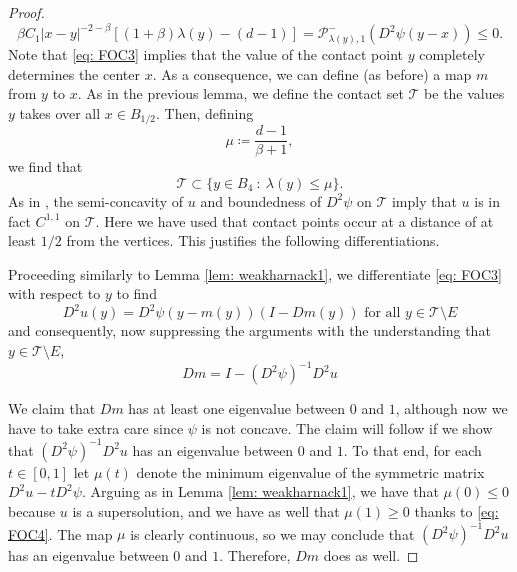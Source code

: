 \documentclass[reqno]{amsart}
\numberwithin{equation}{section}
\numberwithin{equation}{section}
\newcommand{\ds}{\displaystyle}
\begin{document}
\begin{proof}
\begin{equation}
\label{eq: doublingbetaeq} \beta C_1 |x-y|^{-2-\beta} [(1+\beta) \lambda(y) - (d-1)] =\mathcal{P}^-_{\lambda(y),1}(D^2\psi(y-x)) \le 0.
\end{equation}
Note that \eqref{eq: FOC3} implies that the value of the contact point $y$ completely determines the center $x$. As a consequence, we can define (as before) a map $m$ from $y$ to $x$. As in the previous lemma, we define the contact set $\mathcal{T}$ be the values $y$ takes over all $x \in B_{1/2}$. Then, defining 
$$\mu  \coloneqq \ds \frac{d-1}{\beta +1},$$
we find that 
\begin{equation}
\label{eq: contactsmallellipticity} \mathcal{T} \subset \{y \in B_4 \ : \ \lambda(y) \le \mu\}.
\end{equation}
As in \cite{ArmstrongSmart2014}, the semi-concavity of $u$ and boundedness of $D^2\psi$ on $\mathcal{T}$ imply that $u$ is in fact $C^{1,1}$ on $\mathcal{T}$. Here we have used that contact points occur at a distance of at least $1/2$ from the vertices. This justifies the following differentiations.

Proceeding similarly to Lemma \ref{lem: weakharnack1}, we differentiate \eqref{eq: FOC3} with respect to $y$ to find 
$$D^2u(y) = D^2\psi(y-m(y))(I- Dm(y)) \text{ for all } y \in \mathcal{T} \setminus E$$
and consequently, now suppressing the arguments with the understanding that $y \in \mathcal{T}\setminus E$,
\begin{equation}
\label{eq: meq}
Dm = I - (D^2\psi)^{-1} D^2u
\end{equation}

We claim that $Dm$ has at least one eigenvalue between $0$ and $1$, although now we have to take extra care since $\psi$ is not concave. The claim will follow if we show that $(D^2\psi)^{-1}D^2u$ has an eigenvalue between $0$ and $1$. To that end, for each $t \in [0,1]$ let $\mu(t)$ denote the minimum eigenvalue of the symmetric matrix $D^2u - t D^2 \psi$. Arguing as in Lemma \ref{lem: weakharnack1}, we have that $\mu(0) \le 0$ because $u$ is a supersolution, and we have as well  that $\mu(1) \ge 0$ thanks to \eqref{eq: FOC4}. The map $\mu$ is clearly continuous, so we may conclude that $(D^2\psi)^{-1}D^2u$ has an eigenvalue between $0$ and $1$. Therefore, $Dm$ does as well. 


\end{proof}
\end{document}
